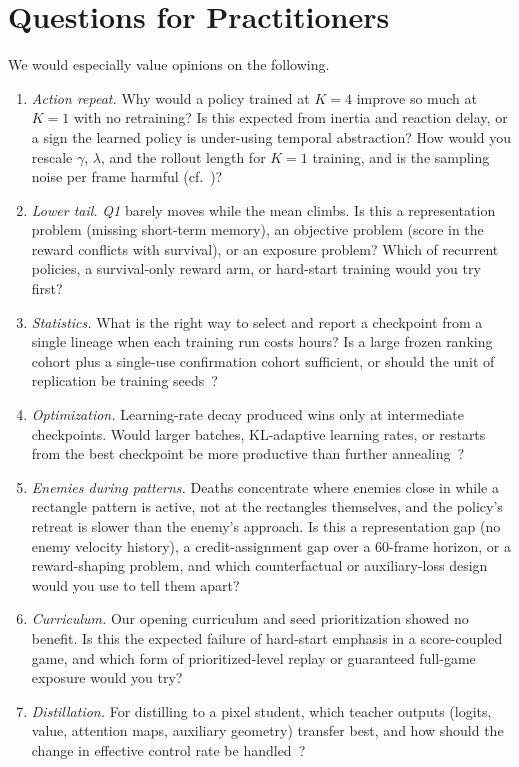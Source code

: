 \documentclass[journal]{IEEEtran}
\newcommand{\Q}[1]{\textit{Q#1}}
\begin{document}
\section{Questions for Practitioners}\label{sec:questions}
We would especially value opinions on the following.
\begin{enumerate}
\item \textit{Action repeat.} Why would a policy trained at $K{=}4$ improve so much at $K{=}1$ with no retraining? Is this expected from inertia and reaction delay, or a sign the learned policy is under-using temporal abstraction? How would you rescale $\gamma$, $\lambda$, and the rollout length for $K{=}1$ training, and is the sampling noise per frame harmful (cf.~\cite{tallec2019time,sharma2017frs})?
\item \textit{Lower tail.} \Q{1} barely moves while the mean climbs. Is this a representation problem (missing short-term memory), an objective problem (score in the reward conflicts with survival), or an exposure problem? Which of recurrent policies, a survival-only reward arm, or hard-start training would you try first?
\item \textit{Statistics.} What is the right way to select and report a checkpoint from a single lineage when each training run costs hours? Is a large frozen ranking cohort plus a single-use confirmation cohort sufficient, or should the unit of replication be training seeds~\cite{henderson2018matters,agarwal2021precipice}?
\item \textit{Optimization.} Learning-rate decay produced wins only at intermediate checkpoints. Would larger batches, KL-adaptive learning rates, or restarts from the best checkpoint be more productive than further annealing~\cite{engstrom2020implementation,andrychowicz2021matters}?
\item \textit{Enemies during patterns.} Deaths concentrate where enemies close in while a rectangle pattern is active, not at the rectangles themselves, and the policy's retreat is slower than the enemy's approach. Is this a representation gap (no enemy velocity history), a credit-assignment gap over a 60-frame horizon, or a reward-shaping problem, and which counterfactual or auxiliary-loss design would you use to tell them apart?
\item \textit{Curriculum.} Our opening curriculum and seed prioritization showed no benefit. Is this the expected failure of hard-start emphasis in a score-coupled game, and which form of prioritized-level replay or guaranteed full-game exposure would you try?
\item \textit{Distillation.} For distilling to a pixel student, which teacher outputs (logits, value, attention maps, auxiliary geometry) transfer best, and how should the change in effective control rate be handled~\cite{rusu2016distill,chen2019cheating}?
\end{enumerate}
\end{document}
